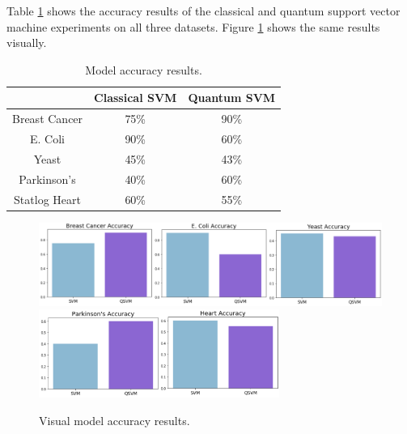 \documentclass{article}
\begin{document}
  Table \ref{table:accuracy} shows the accuracy results of the classical and quantum support vector machine experiments on all three datasets. Figure \ref{fig:results} shows the same results visually. \\

  \begin{table}[h]
    \centering
    \begin{tabular}{c|c|c|}
    \cline{2-3}
                                  & Classical SVM & Quantum SVM \\ \hline
    \multicolumn{1}{|c|}{Breast Cancer} & 75\%          & 90\%        \\ \hline
    \multicolumn{1}{|c|}{E. Coli}   & 90\%          & 60\%        \\ \hline
    \multicolumn{1}{|c|}{Yeast}   & 45\%          & 43\%        \\ \hline
    \multicolumn{1}{|c|}{Parkinson's}   & 40\%          & 60\%        \\ \hline
    \multicolumn{1}{|c|}{Statlog Heart}   & 60\%          & 55\%        \\ \hline
    \end{tabular}
    \caption{\label{table:accuracy}Model accuracy results.}
  \end{table}

  \hfill \break

  \begin{figure}[h]
    \centering
    \includegraphics[width=1\textwidth]{img/acc1.png}
    \includegraphics[width=0.7\textwidth]{img/acc2.png}
    \caption{\label{fig:results}Visual model accuracy results.}
  \end{figure}
\end{document}
